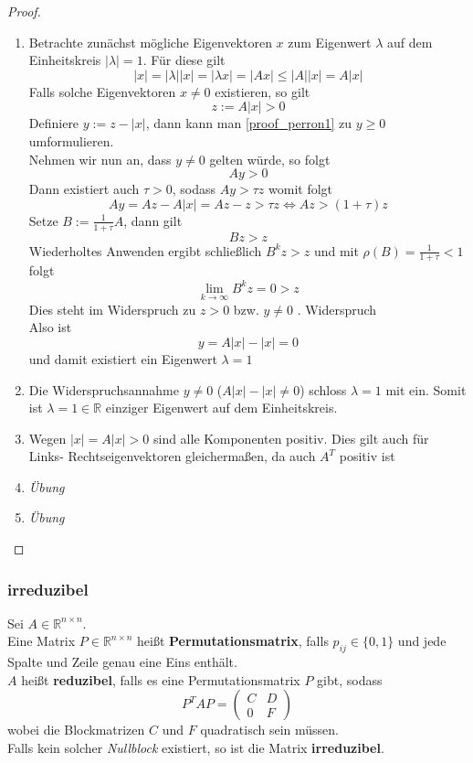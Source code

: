 \documentclass[]{article}
\begin{document}
\begin{proof}~
	\begin{enumerate}
		\item Betrachte zunächst mögliche Eigenvektoren $x$ zum Eigenwert $\lambda$ auf dem Einheitskreis $|\lambda| = 1$. Für diese gilt
		\begin{equation} \label{proof_perron1}
		|x| = |\lambda| |x| = |\lambda x | = |Ax| \leq |A| |x| = A |x|
		\end{equation} 
		Falls solche Eigenvektoren $x \neq 0$ existieren, so gilt
		\[ z := A |x| > 0 \]
		Definiere $y:=z - |x|$, dann kann man \eqref{proof_perron1} zu
		$y \geq 0$ umformulieren. \\
		Nehmen wir nun an, dass $y \neq 0$ gelten würde, so folgt
		\[ Ay > 0 \]
		Dann existiert auch $\tau>0$, sodass $Ay > \tau z$ womit folgt
		\begin{equation*}
		Ay = Az - A|x| = Az - z > \tau z  \Leftrightarrow Az > (1+\tau) z
		\end{equation*}
		Setze $B := \frac{1}{1+\tau} A$, dann gilt
		\[ Bz > z \]
		Wiederholtes Anwenden ergibt schließlich
		$B^k z > z$ und mit $\rho(B) = \frac{1}{1+\tau} < 1$ folgt
		\[ \lim_{k \to \infty} B^k z = 0 > z \]
		Dies steht im Widerspruch zu $z>0$ bzw. $y \neq 0$ \hfill. Widerspruch \\
		Also ist 
		\[y = A|x| - |x| = 0 \]
		und damit existiert ein Eigenwert $\lambda = 1$
	\item Die Widerspruchsannahme $y \neq 0$ ($A|x| - |x| \neq 0$) schloss $\lambda = 1$ mit ein. Somit ist $\lambda = 1 \in \mathbb{R}$  einziger Eigenwert auf dem Einheitskreis.
	\item Wegen $|x| = A|x| > 0$ sind alle Komponenten positiv. Dies gilt auch für Links- Rechtseigenvektoren gleichermaßen, da auch $A^T$ positiv ist
	\item \textit{Übung}
	\item \textit{Übung}
\end{enumerate}
\end{proof}

\subsubsection*{irreduzibel}
Sei $A \in \mathbb{R}^{n \times n}$. \\
Eine Matrix $P \in \mathbb{R}^{n \times n}$ heißt \textbf{Permutationsmatrix}, falls $p_{ij} \in \{0,1\}$ und jede Spalte und Zeile genau eine Eins enthält. \\
$A$ heißt \textbf{reduzibel}, falls es eine Permutationsmatrix $P$ gibt, sodass
\[ P^T A P = 
\begin{pmatrix}
C & D \\
0 & F 
\end{pmatrix}  \]
wobei die Blockmatrizen $C$ und $F$ quadratisch sein müssen. \\
Falls kein solcher \textit{Nullblock} existiert, so ist die Matrix \textbf{irreduzibel}.
\end{document}
